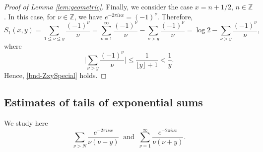 \documentclass[11pt,letterpaper,oneside,reqno]{amsart}
\renewcommand{\^}[1]{\widehat{#1}}
\newcommand{\Z}{{\mathbb{Z}}}
\numberwithin{equation}{section}
\theoremstyle{remark}
\begin{document}
\begin{proof}[Proof of Lemma \ref{lem:geometric}]
        Finally, we consider the case $x=n+1/2$, $n\in\Z$. In this case, for $\nu\in\Z$, we have $e^{-2\pi i \nu x} =(-1)^\nu$. Therefore, 
        \begin{equation*}
            S_1(x,y) = \sum_{1\leq \nu \leq y}\frac{(-1)^\nu}{\nu} = \sum_{\nu = 1}^\infty\frac{(-1)^\nu}{\nu} - \sum_{\nu > y }\frac{(-1)^\nu}{\nu}  = \log 2 - \sum_{\nu > y }\frac{(-1)^\nu}{\nu},
        \end{equation*}
        where 
        \[
           \bigg| 
            \sum_{\nu > y }\frac{(-1)^\nu}{\nu}
            \bigg|  \leq \frac{1}{\lfloor y \rfloor +1} < \frac{1}{y}.
        \]
        Hence, \eqref{bnd-ZxySpecial} holds.
    \end{proof}
%
\subsection{Estimates of tails of exponential sums}
%
We study here
\[
\sum_{ \nu > N} \frac{e^{-2\pi i \nu x}}{\nu(\nu-y) }
\ \text{ and }\ \sum_{ \nu=1}^{\infty} \frac{e^{-2\pi i \nu x}}{\nu(\nu+y) }.
\]
%
\end{document}
